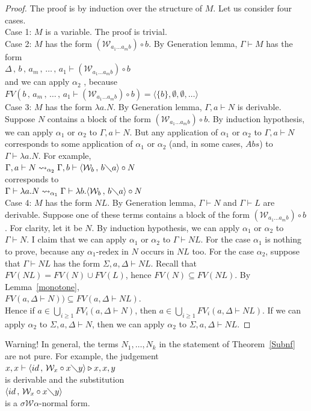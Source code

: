 \documentclass[11pt]{amsart}
\theoremstyle{plain}
\theoremstyle{definition}
\theoremstyle{remark}
\numberwithin{equation}{section}
\newcommand{\tri}{\triangleright}
\newcommand{\ci}{\circ}
\newcommand{\ri}{\rightsquigarrow}
\newcommand{\mi}{\,,\,}
\newcommand{\is}{\diagdown}
\newcommand{\la}{\langle}
\newcommand{\ra}{\rangle}
\newcommand{\x}{a}
\newcommand{\y}{b}
\renewcommand{\pi}{\mathcal{W}}
\begin{document}
\begin{proof}The proof is by induction over the structure of $M$. Let us consider four cases.\\[5pt]
Case 1: $M$ is a variable. The proof is trivial.\\[5pt]
 Case 2:  $ M$
has the form $(\pi_{\x_1\ldots\x_m\y})\ci \y$. By Generation
lemma, $\Gamma\vdash M$
has the form\\
$\Delta\mi\y\mi\x_m\mi\ldots\mi \x_1\vdash
(\pi_{\x_1\ldots\x_m\y})\ci \y$  \\
and we can apply $\alpha_2$ , because\\
 $FV(\y\mi\x_m\mi\ldots\mi
\x_1\vdash (\pi_{\x_1\ldots\x_m\y})\ci \y)=\la\{\y\},\emptyset,\emptyset,\ldots\ra$\\[10pt]
 Case 3: $M$ has the form $\lambda \x.N$. By Generation lemma, $\Gamma,\x\vdash
N$ is derivable. Suppose $N$ contains a block of the form
 $(\pi_{\x_1\ldots\x_m\y})\ci \y$. By
induction hypothesis, we can apply $\alpha_1$ or $\alpha_2$ to
$\Gamma,\x\vdash N$. But any application  of $\alpha_1$ or
$\alpha_2$ to $\Gamma,\x\vdash N$ corresponds to some application
of $\alpha_1$ or $\alpha_2$ (and, in some cases, $Abs$) to
$\Gamma\vdash\lambda \x.N$. For example,\\
$\Gamma,\x\vdash N\ri_{\alpha_2}\Gamma,\y \vdash\la\pi_{\y}\mi
\y\is \x\ra\ci N$\\
corresponds to\\
 $\Gamma\vdash\lambda
\x.N\ri_{\alpha_1}\Gamma\vdash\lambda \y.\la\pi_{\y}\mi
\y\is \x\ra\ci N$\\[10pt]
 Case 4: $M$ has the form $NL$. By Generation lemma, $\Gamma\vdash N$ and
$\Gamma\vdash L$ are derivable. Suppose one of these terms
contains a block of the form $(\pi_{\x_1\ldots\x_m\y})\ci \y$. For
clarity, let it be $N$. By induction hypothesis,  we can apply
$\alpha_1$ or $\alpha_2$ to $\Gamma\vdash N$. I claim that we can
apply $\alpha_1$ or $\alpha_2$ to $\Gamma\vdash NL$. For the case
$\alpha_1$ is nothing to prove, because any $\alpha_1$-redex in
$N$ occurs in $NL$ too. For the case $\alpha_2$, suppose that
$\Gamma\vdash NL$ has the form $\Sigma,\x,\Delta\vdash NL$. Recall
that $FV(NL)=FV(N)\cup FV(L)$, hence $FV(N)\subseteq FV(NL)$. By
Lemma~\ref{monotone},\\ $FV(\x,\Delta\vdash N))\subseteq FV(\x,\Delta\vdash NL)$.\\
Hence if $\x\in \bigcup_{i\geqslant 1} FV_i(\x,\Delta\vdash N)$,
then $\x\in \bigcup_{i\geqslant 1} FV_i(\x,\Delta\vdash NL)$. If
we can apply $\alpha_2$ to $\Sigma,\x,\Delta\vdash N$, then we can
apply $\alpha_2$ to $\Sigma,\x,\Delta\vdash NL$.
\end{proof}
 Warning!
In general, the terms $N_1,\ldots,N_k$ in the statement of
Theorem~\ref{Subnf} are not pure.  For example, the judgement\\
$x,x\vdash\la id\mi\pi_x\ci x\is y\ra\tri x,x,y$\\ is derivable
and the substitution\\ $\la id\mi\pi_x\ci x\is y\ra$\\ is a
$\sigma\pi\alpha$-normal form.
\newpage
\end{document}
